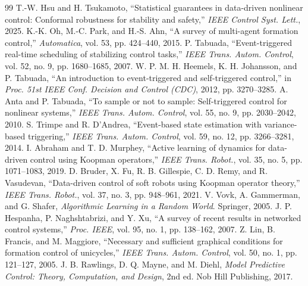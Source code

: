 \documentclass[10pt,conference]{IEEEtran}
\begin{document}
\begin{thebibliography}{99}
 T.-W. Hsu and H. Tsukamoto, ``Statistical guarantees in data-driven nonlinear control: Conformal robustness for stability and safety,'' \emph{IEEE Control Syst. Lett.}, 2025.
 K.-K. Oh, M.-C. Park, and H.-S. Ahn, ``A survey of multi-agent formation control,'' \emph{Automatica}, vol. 53, pp. 424--440, 2015.
 P. Tabuada, ``Event-triggered real-time scheduling of stabilizing control tasks,'' \emph{IEEE Trans. Autom. Control}, vol. 52, no. 9, pp. 1680--1685, 2007.
 W. P. M. H. Heemels, K. H. Johansson, and P. Tabuada, ``An introduction to event-triggered and self-triggered control,'' in \emph{Proc. 51st IEEE Conf. Decision and Control (CDC)}, 2012, pp. 3270--3285.
 A. Anta and P. Tabuada, ``To sample or not to sample: Self-triggered control for nonlinear systems,'' \emph{IEEE Trans. Autom. Control}, vol. 55, no. 9, pp. 2030--2042, 2010.
 S. Trimpe and R. D'Andrea, ``Event-based state estimation with variance-based triggering,'' \emph{IEEE Trans. Autom. Control}, vol. 59, no. 12, pp. 3266--3281, 2014.
 I. Abraham and T. D. Murphey, ``Active learning of dynamics for data-driven control using Koopman operators,'' \emph{IEEE Trans. Robot.}, vol. 35, no. 5, pp. 1071--1083, 2019.
 D. Bruder, X. Fu, R. B. Gillespie, C. D. Remy, and R. Vasudevan, ``Data-driven control of soft robots using Koopman operator theory,'' \emph{IEEE Trans. Robot.}, vol. 37, no. 3, pp. 948--961, 2021.
 V. Vovk, A. Gammerman, and G. Shafer, \emph{Algorithmic Learning in a Random World}. Springer, 2005.
 J. P. Hespanha, P. Naghshtabrizi, and Y. Xu, ``A survey of recent results in networked control systems,'' \emph{Proc. IEEE}, vol. 95, no. 1, pp. 138--162, 2007.
 Z. Lin, B. Francis, and M. Maggiore, ``Necessary and sufficient graphical conditions for formation control of unicycles,'' \emph{IEEE Trans. Autom. Control}, vol. 50, no. 1, pp. 121--127, 2005.
 J. B. Rawlings, D. Q. Mayne, and M. Diehl, \emph{Model Predictive Control: Theory, Computation, and Design}, 2nd ed. Nob Hill Publishing, 2017.

\end{thebibliography}
\end{document}
